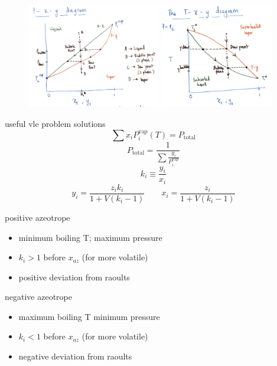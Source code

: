\documentclass{article}
\begin{document}
\begin{figure}[H]
    \includegraphics[width=0.52\textwidth, frame]{pxy.png}
    \includegraphics[width=0.442\textwidth, frame]{txy.png}
\end{figure}
\begin{minipage}[t]{0.47\textwidth}
    useful vle problem solutions
    \[\sum x_{i} P^{\text{vap}}_{i}(T) = P_{\text{total}}\]
    \[P_{\text{total}} = \frac{1}{\displaystyle\sum \frac{y_{i}}{P^{\text{vap}}_{i}}}\]
    \[k_i \equiv \frac{y_i}{x_i} \] 
    \[y_{i} = \frac{z_{i} k_{i} }{1 + V(k_{i} -1)} \hspace{2em} x_{i} = \frac{z_{i} }{1 + V(k_{i} -1)}\] 
\end{minipage}
\begin{minipage}[t]{0.47\textwidth}
    positive azeotrope
    \begin{itemize}
        \item minimum boiling T; maximum pressure
        \item $k_i>1$ before $x_{az}$ (for more volatile)
        \item positive deviation from raoults
    \end{itemize}
    negative azeotrope
    \begin{itemize}
        \item maximum boiling T minimum pressure
        \item $k_i<1$ before $x_{az}$ (for more volatile)
        \item negative deviation from raoults
    \end{itemize}
\end{minipage}
\end{document}
